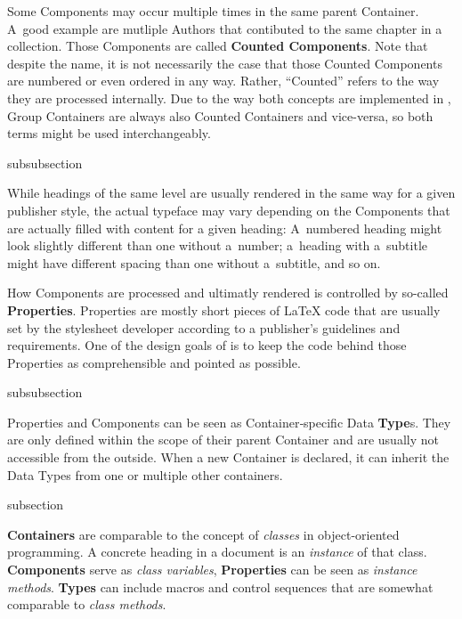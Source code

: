 Some Components may occur multiple times in the same parent
Container. A~good example are mutliple Authors that contibuted to the
same chapter in a collection. Those Components are called
\textbf{Counted Components}. Note that
despite the name, it is not necessarily the case that those Counted
Components are numbered or even ordered in any way. Rather,
``Counted'' refers to the way they are processed internally. Due to
the way both concepts are implemented in {\CoCoTeX}, Group Containers
are always also Counted Containers and vice-versa, so both terms might
be used interchangeably.

\begin{heading}[label=sec:overview.properties]{subsubsection}
\end{heading}

While headings of the same level are usually rendered in the same way
for a given publisher style, the actual typeface may vary depending on
the Components that are actually filled with content for a given
heading: A~numbered heading might look slightly different than one
without a~number; a~heading with a~subtitle might have different
spacing than one without a~subtitle, and so on.

How Components are processed and ultimatly rendered is controlled by
so-called \textbf{Properties}. Properties are
mostly short pieces of {\LaTeX} code that are usually set by the
stylesheet developer according to a publisher's guidelines and
requirements. One of the design goals of {\CoCoTeX} is to keep the
code behind those Properties as comprehensible and pointed as
possible.

\begin{heading}[label=sec:overview.types]{subsubsection}
\end{heading}

Properties and Components can be seen as Container‐specific Data
\textbf{Type}s. They are only defined within the
scope of their parent Container and are usually not accessible from
the outside. When a new Container is declared, it can inherit the Data
Types from one or multiple other containers.

\begin{heading}[label=sec:oop]{subsection}
\end{heading}


\textbf{Containers} are comparable to the concept of \textit{classes}
in object-oriented programming. A concrete heading in a document is an
\textit{instance} of that class. \textbf{Components} serve as
\textit{class variables}, \textbf{Properties} can be seen as
\textit{instance methods}. \textbf{Types} can include macros and
control sequences that are somewhat comparable to \textit{class
  methods}.

